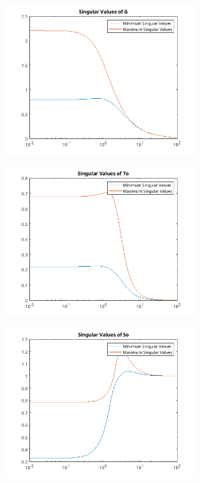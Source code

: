 \documentclass{article}
\begin{document}
\begin{figure}[H]
    \centering
    \includegraphics[width=0.75\textwidth]{svG.png}
    \label{fig:svG}
\end{figure}

\begin{figure}[H]
    \centering
    \includegraphics[width=0.75\textwidth]{svTo.png}
    \label{fig:svTo}
\end{figure}

\begin{figure}[H]
    \centering
    \includegraphics[width=0.75\textwidth]{svSo.png}
    \label{fig:svSo}
\end{figure}
\end{document}
